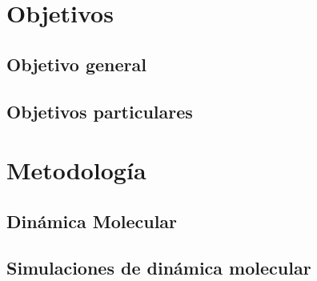 \documentclass[11pt]{article}
\begin{document}
\section{Objetivos}
\subsection{Objetivo general}



\subsection{Objetivos particulares}

\section{Metodología}
\subsection{Dinámica Molecular}\label{sec:md}
\subsection{Simulaciones de dinámica molecular}

\clearpage
\end{document}
